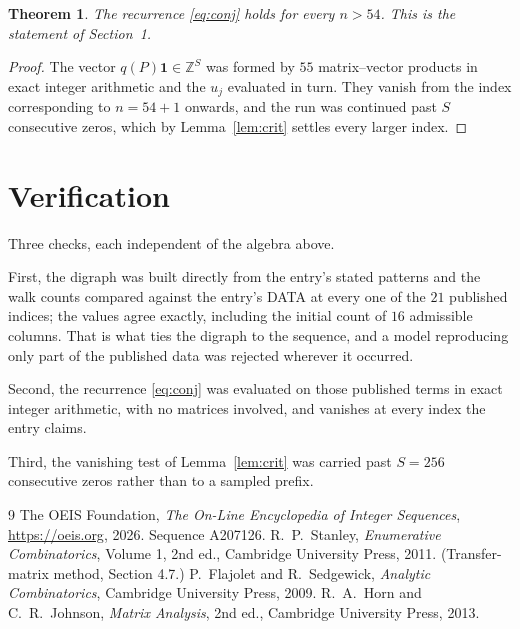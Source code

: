 \documentclass[11pt,a4paper]{article}
\theoremstyle{plain}
\newtheorem{theorem}{Theorem}
\theoremstyle{definition}
\begin{document}
\begin{theorem}
The recurrence \eqref{eq:conj} holds for every $n>54$. This is the statement of
Section~1.
\end{theorem}

\begin{proof}
The vector $q(P)\mathbf{1}\in\mathbb{Z}^{S}$ was formed by $55$ matrix--vector
products in exact integer arithmetic and the $u_j$ evaluated in turn. They vanish from the
index corresponding to $n=54+1$ onwards, and the run was continued past $S$ consecutive
zeros, which by Lemma~\ref{lem:crit} settles every larger index.
\end{proof}

\section{Verification}

Three checks, each independent of the algebra above.

First, the digraph was built directly from the entry's stated patterns and the walk counts
compared against the entry's DATA at every one of the $21$ published indices; the
values agree exactly, including the initial count of $16$ admissible columns. That is
what ties the digraph to the sequence, and a model reproducing only part of the published
data was rejected wherever it occurred.

Second, the recurrence \eqref{eq:conj} was evaluated on those published terms in exact
integer arithmetic, with no matrices involved, and vanishes at every index the entry claims.

Third, the vanishing test of Lemma~\ref{lem:crit} was carried past $S=256$ consecutive
zeros rather than to a sampled prefix.

\begin{thebibliography}{9}
 The OEIS Foundation, \emph{The On-Line Encyclopedia of Integer
Sequences}, \url{https://oeis.org}, 2026. Sequence A207126.
 R.~P.~Stanley, \emph{Enumerative Combinatorics}, Volume 1, 2nd ed.,
Cambridge University Press, 2011. (Transfer-matrix method, Section 4.7.)
 P.~Flajolet and R.~Sedgewick, \emph{Analytic Combinatorics}, Cambridge
University Press, 2009.
 R.~A.~Horn and C.~R.~Johnson, \emph{Matrix Analysis}, 2nd ed., Cambridge
University Press, 2013.
\end{thebibliography}
\end{document}
